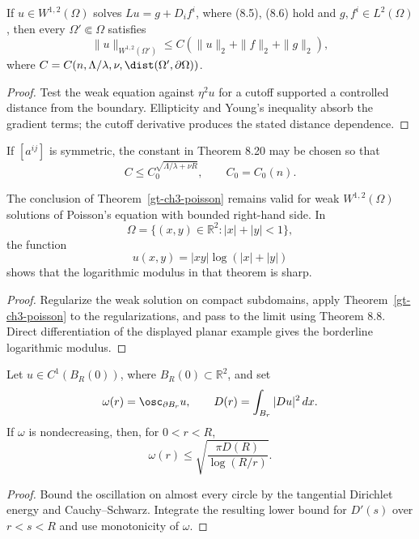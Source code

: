 \begin{proposition}
\label{gt-prop-8-interior-energy-estimate}
If $u\in W^{1,2}(\Omega)$ solves $Lu=g+D_if^i$, where (8.5), (8.6) hold and
$g,f^i\in L^2(\Omega)$, then every $\Omega'\Subset\Omega$ satisfies
\begin{equation}
\|u\|_{W^{1,2}(\Omega')}
\leq C(\|u\|_2+\|f\|_2+\|g\|_2),
\tag{8.101}
\end{equation}
where
$C=C(n,\Lambda/\lambda,\nu,\dist(\Omega',\partial\Omega))$.
\end{proposition}
\begin{proof}
\sketch Test the weak equation against $\eta^2u$ for a cutoff supported a
controlled distance from the boundary. Ellipticity and Young's inequality absorb
the gradient terms; the cutoff derivative produces the stated distance dependence.
\end{proof}

\begin{proposition}
\label{gt-prop-8-symmetric-harnack-constant}
If $[a^{ij}]$ is symmetric, the constant in Theorem 8.20 may be chosen so that
\[
C\leq C_0^{\sqrt{\Lambda/\lambda+\nu R}},
\qquad C_0=C_0(n).
\]
\end{proposition}

\begin{proposition}
\label{gt-prop-8-sobolev-poisson-sharpness}
The conclusion of Theorem~\ref{gt-ch3-poisson} remains valid for weak
$W^{1,2}(\Omega)$ solutions of Poisson's equation with bounded right-hand side.
In
\[
\Omega=\{(x,y)\in\mathbb R^2:|x|+|y|<1\},
\]
the function
\[
u(x,y)=|xy|\log(|x|+|y|)
\]
shows that the logarithmic modulus in that theorem is sharp.
\end{proposition}
\begin{proof}
\sketch Regularize the weak solution on compact subdomains, apply
Theorem~\ref{gt-ch3-poisson} to the regularizations, and pass to the limit using
Theorem 8.8. Direct differentiation of the displayed planar example gives the
borderline logarithmic modulus.
\end{proof}

\begin{lemma}
\label{gt-lem-8-planar-circle-oscillation}
Let $u\in C^1(B_R(0))$, where $B_R(0)\subset\mathbb R^2$, and set
\[
\omega(r)=\osc_{\partial B_r}u,
\qquad
D(r)=\int_{B_r}|Du|^2\,dx.
\]
If $\omega$ is nondecreasing, then, for $0<r<R$,
\[
\omega(r)\leq\sqrt{\frac{\pi D(R)}{\log(R/r)}}.
\]
\end{lemma}
\begin{proof}
\sketch Bound the oscillation on almost every circle by the tangential
Dirichlet energy and Cauchy--Schwarz. Integrate the resulting lower bound for
$D'(s)$ over $r<s<R$ and use monotonicity of $\omega$.
\end{proof}

